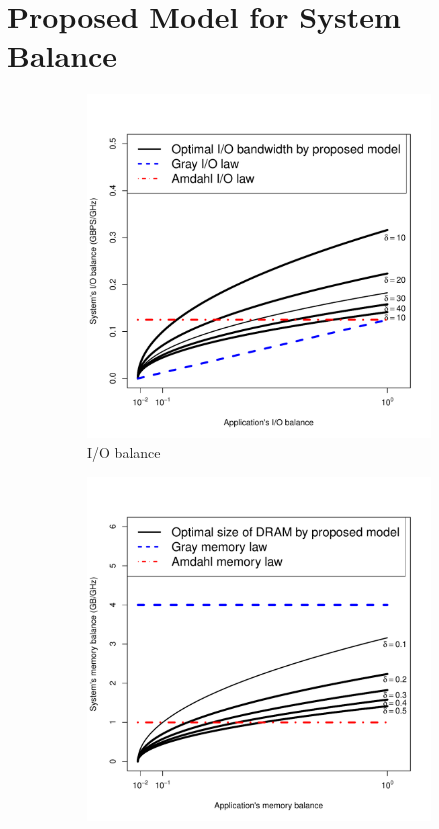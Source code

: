 \documentclass[journal]{IEEEtran}
\begin{document}
\section{Proposed Model for System Balance} \label{sec:Model}
\begin{figure}[htb]
	\begin{subfigure}[b]{0.48\textwidth}
                \includegraphics[width=\textwidth]{Figures/ModelFigures/beta_io.pdf}
                \caption{I/O balance}
                \label{fig:beta_io}
    \end{subfigure}
 	\begin{subfigure}[b]{0.48\textwidth}
                \includegraphics[width=\textwidth]{Figures/ModelFigures/beta_mem.pdf}

\end{subfigure}
\end{figure}
\end{document}
